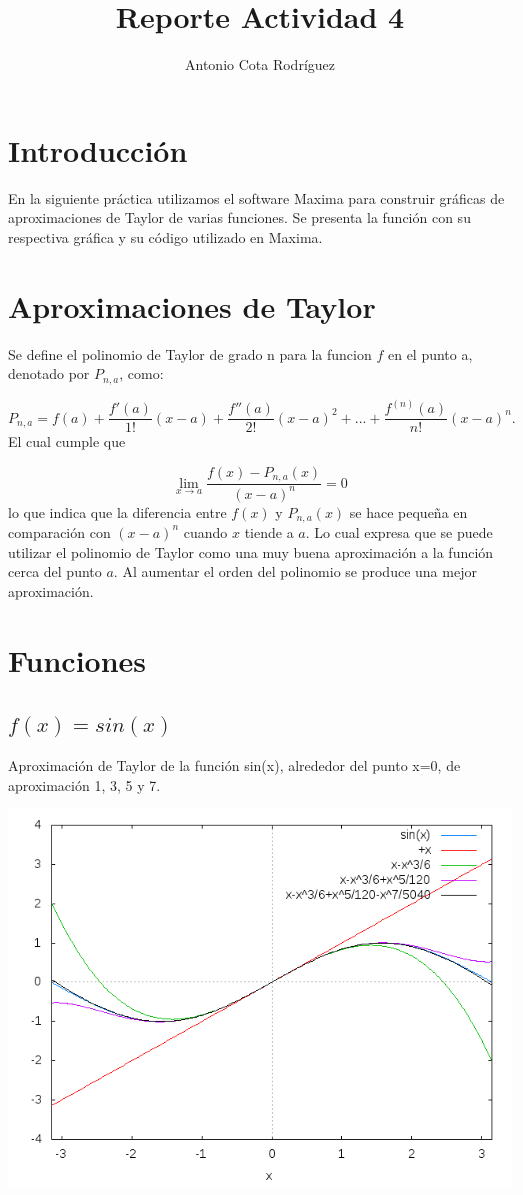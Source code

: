 \documentclass{article}
\title{Reporte Actividad 4}
\author{Antonio Cota Rodr\'iguez}
\date{}
\begin{document}
\maketitle

\graphicspath{ {Imagenes/} }


\section{Introducci\'on}

En la siguiente pr\'actica utilizamos el software Maxima para construir gr\'aficas de aproximaciones de Taylor de varias funciones. Se presenta la funci\'on con su respectiva gr\'afica y su c\'odigo utilizado en Maxima.

\section{Aproximaciones de Taylor}
Se define el polinomio de Taylor de grado n para la funcion $f$ en el punto a, denotado por $P_{n,a}$, como:

$$P_{n,a} = f(a) + \frac{f'(a)}{1!}(x-a) + \frac{f''(a)}{2!}(x-a)^2 + ... + \frac{f^{(n)}(a)}{n!}(x-a)^n. $$
El cual cumple que

$$\lim_{x\to a} \frac{f(x)-P_{n,a}(x)}{(x-a)^n}=0$$
lo que indica que la diferencia entre $f(x)$ y $P_{n,a}(x)$ se hace peque\~na en comparaci\'on con $(x-a)^n$ cuando $x$ tiende a $a$. Lo cual expresa que se puede utilizar el polinomio de Taylor como una muy buena aproximaci\'on a la funci\'on cerca del punto $a$. Al aumentar el orden del polinomio se produce una mejor aproximaci\'on.
\section{Funciones}



\subsection{$f(x)= sin(x)$}
Aproximaci\'on de Taylor de la funci\'on sin(x), alrededor del punto  x=0, de aproximaci\'on 1, 3, 5 y 7.

\includegraphics[scale=.5]{Sin(x)}
\end{document}
